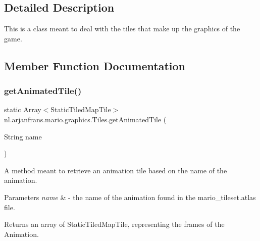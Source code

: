 \subsection{Detailed Description}
This is a class meant to deal with the tiles that make up the graphics of the game. 

\subsection{Member Function Documentation}
\mbox{\label{classnl_1_1arjanfrans_1_1mario_1_1graphics_1_1Tiles_a032fa48452ac57c65e8e86c23a28f0ee}} 
\subsubsection{\texorpdfstring{get\+Animated\+Tile()}{getAnimatedTile()}}
{\footnotesize\ttfamily static Array$<$Static\+Tiled\+Map\+Tile$>$ nl.\+arjanfrans.\+mario.\+graphics.\+Tiles.\+get\+Animated\+Tile (\begin{DoxyParamCaption}\item[{String}]{name }\end{DoxyParamCaption})\hspace{0.3cm}{\ttfamily [static]}}



A method meant to retrieve an animation tile based on the name of the animation. 


\begin{DoxyParams}{Parameters}
{\em name} & -\/ the name of the animation found in the mario\+\_\+tileset.\+atlas file. \\
\hline
\end{DoxyParams}
\begin{DoxyReturn}{Returns}
an array of Static\+Tiled\+Map\+Tile, representing the frames of the Animation. 
\end{DoxyReturn}
\mbox{\label{classnl_1_1arjanfrans_1_1mario_1_1graphics_1_1Tiles_a2448c85397533ac26d5c0159e7746e1a}} 
